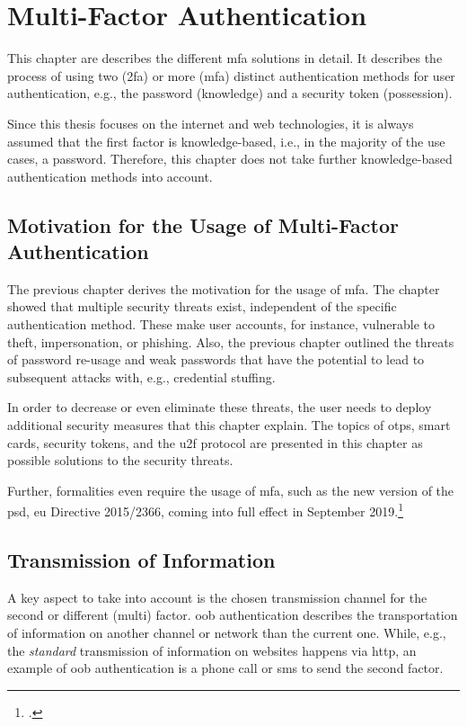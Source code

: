 \chapter{Multi-Factor Authentication}
\label{chap:mfa}

This chapter are describes the different \gls{mfa} solutions in detail. It describes the process of using two (\gls{2fa}) or more (\gls{mfa}) distinct authentication methods for user authentication, e.g., the password (knowledge) and a security token (possession).

Since this thesis focuses on the internet and web technologies, it is always assumed that the first factor is knowledge-based, i.e., in the majority of the use cases, a password. Therefore, this chapter does not take further knowledge-based authentication methods into account.

\section{Motivation for the Usage of Multi-Factor Authentication}

The previous chapter derives the motivation for the usage of \gls{mfa}. The chapter showed that multiple security threats exist, independent of the specific authentication method. These make user accounts, for instance, vulnerable to theft, impersonation, or phishing. Also, the previous chapter outlined the threats of password re-usage and weak passwords that have the potential to lead to subsequent attacks with, e.g., credential stuffing.

 In order to decrease or even eliminate these threats, the user needs to deploy additional security measures that this chapter explain. The topics of \glspl{otp}, smart cards, security tokens, and the \gls{u2f} protocol are presented in this chapter as possible solutions to the security threats.
 
 Further, formalities even require the usage of \gls{mfa}, such as the new version of the \gls{psd}, \gls{eu} Directive 2015/2366, coming into full effect in September 2019.\footcites[See][10]{NOCTOR20189}

\newpage

\section{Transmission of Information}

A key aspect to take into account is the chosen transmission channel for the second or different (multi) factor. \gls{oob} authentication describes the transportation of information on another channel or network than the current one. While, e.g., the \textit{standard} transmission of information on websites happens via \gls{http}, an example of \gls{oob} authentication is a phone call or \gls{sms} to send the second factor.

